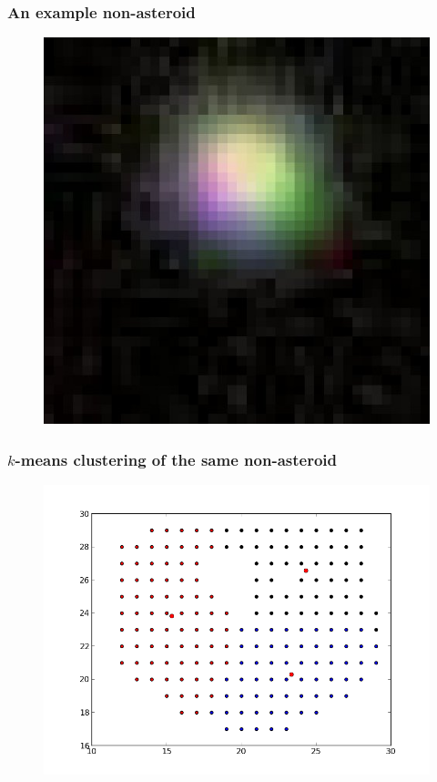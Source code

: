 \documentclass{beamer}
\begin{document}
\begin{frame}
    \frametitle{An example non-asteroid}
    \begin{figure}
        \centering
        \includegraphics[height=0.8\paperheight]{494_large.jpg}
    \end{figure}
\end{frame}

\begin{frame}
    \frametitle{$k$-means clustering of the same non-asteroid}
    \begin{figure}
        \centering
        \includegraphics[height=0.8\paperheight]{clust-494.png}
    \end{figure}
\end{frame}
\end{document}

